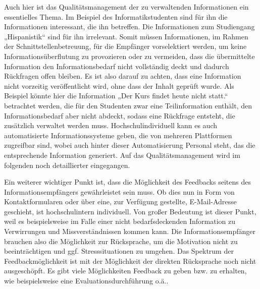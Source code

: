 Auch hier ist das Qualitätsmanagement der zu verwaltenden Informationen ein essentielles Thema. 
Im Beispiel des Informatikstudenten sind für ihn die Informationen interessant, die ihn betreffen. 
Die Informationen zum Studiengang „Hispanistik“ sind für ihn irrelevant. 
Somit müssen Informationen, im Rahmen der Schnittstellenbetreuung, für die Empfänger vorselektiert werden, um keine Informationsüberflutung zu provozieren oder zu vermeiden, dass die übermittelte Information den Informationsbedarf nicht vollständig deckt und dadurch Rückfragen offen bleiben. 
Es ist also darauf zu achten, dass eine Information nicht vorzeitig veröffentlicht wird, ohne dass der Inhalt geprüft wurde. 
Als Beispiel könnte hier die Information „Der Kurs findet heute nicht statt.“ betrachtet werden, die für den Studenten zwar eine Teilinformation enthält, den Informationsbedarf aber nicht abdeckt, sodass eine Rückfrage entsteht, die zusätzlich verwaltet werden muss. 
Hochschulindividuell kann es auch automatisierte Informationssysteme geben, die von mehreren Plattformen zugreifbar sind, wobei auch hinter dieser Automatisierung Personal steht, das die entsprechende Information generiert. 
Auf das Qualitätsmanagement wird im folgenden noch detaillierter eingegangen.

Ein weiterer wichtiger Punkt ist, dass die Möglichkeit des Feedbacks seitens des Informationsempfängers gewährleistet sein muss. 
Ob dies nun in Form von Kontaktformularen oder über eine, zur Verfügung gestellte, E-Mail-Adresse geschieht, ist hochschulintern individuell. 
Von großer Bedeutung ist dieser Punkt, weil es beispielsweise im Falle einer nicht bedarfsdeckenden Information zu Verwirrungen und Missverständnissen kommen kann. 
Die Informationsempfänger brauchen also die Möglichkeit zur Rücksprache, um die Motivation nicht zu beeinträchtigen und ggf. Stresssituationen zu umgehen. 
Das Spektrum der Feedbackmöglichkeit ist mit der Möglichkeit der direkten Rücksprache noch nicht ausgeschöpft. 
Es gibt viele Möglichkeiten Feedback zu geben bzw. zu erhalten, wie beispielsweise eine Evaluationsdurchführung o.ä..